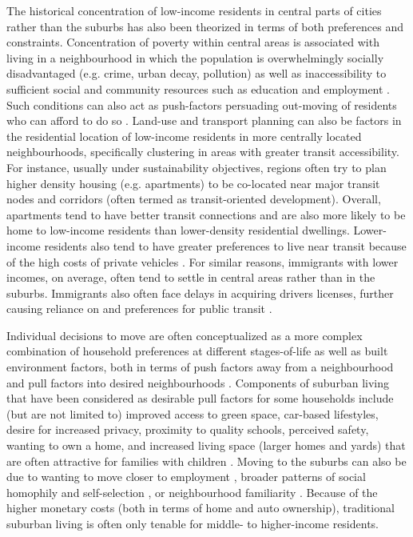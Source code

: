 The historical concentration of low-income residents in central parts of cities rather than the suburbs has also been theorized in terms of both preferences and constraints. Concentration of poverty within central areas is associated with living in a neighbourhood in which the population is overwhelmingly socially disadvantaged (e.g. crime, urban decay, pollution) as well as inaccessibility to sufficient social and community resources such as education and employment \cite{wilson_truly_2012, lucas_transport_2012,sampson_great_2012}. Such conditions can also act as push-factors persuading out-moving of residents who can afford to do so \cite{jones_neighbourhood_2021}. Land-use and transport planning can also be factors in the residential location of low-income residents in more centrally located neighbourhoods, specifically clustering in areas with greater transit accessibility. For instance, usually under sustainability objectives, regions often try to plan higher density housing (e.g. apartments) to be co-located near major transit nodes and corridors (often termed as transit-oriented development). Overall, apartments tend to have better transit connections and are also more likely to be home to low-income residents than lower-density residential dwellings. Lower-income residents also tend to have greater preferences to live near transit because of the high costs of private vehicles \cite{glaeser_why_2008}. For similar reasons, immigrants with lower incomes, on average, often tend to settle in central areas rather than in the suburbs. Immigrants also often face delays in acquiring drivers licenses, further causing reliance on and preferences for public transit \cite{blumenberg_getting_2010,blumenberg_planning_2010,lo_relationship_2011}. 

Individual decisions to move are often conceptualized as a more complex combination of household preferences at different stages-of-life as well as built environment factors, both in terms of push factors away from a neighbourhood and pull factors into desired neighbourhoods \cite{short_residential_1978,lee_residential_2010,coulter_what_2015,saghapour_role_2019}. Components of suburban living that have been considered as desirable pull factors for some households include (but are not limited to) improved access to green space, car-based lifestyles, desire for increased privacy, proximity to quality schools, perceived safety, wanting to own a home, and increased living space (larger homes and yards) that are often attractive for families with children \cite{liao_compact_2015,willing_is_2017}. Moving to the suburbs can also be due to wanting to move closer to employment \cite{huang_tracking_2018}, broader patterns of social homophily and self-selection \cite{sampson_neighborhood_2008,van_gent_sociocultural_2019}, or neighbourhood familiarity \cite{chen_decomposing_2011}. Because of the higher monetary costs (both in terms of home and auto ownership), traditional suburban living is often only tenable for middle- to higher-income residents.

